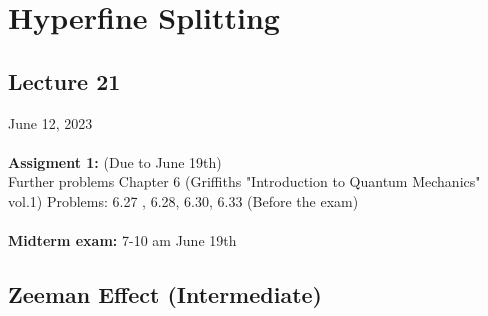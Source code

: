 \documentclass[12pt,fancychapters]{report}
\numberwithin{equation}{section}
\begin{document}
\newpage
\chapter{Hyperfine Splitting}
\section{Lecture 21}
June 12, 2023\\
\\
\textbf{Assigment 1:} (Due to June 19th)\\
Further problems Chapter 6 (Griffiths  "Introduction to Quantum Mechanics" vol.1) Problems: 6.27
, 6.28, 6.30, 6.33 (Before the exam)\\
\\
\textbf{Midterm exam: }7-10 am June 19th 

\section{Zeeman Effect (Intermediate)}










































\newpage
\end{document}
